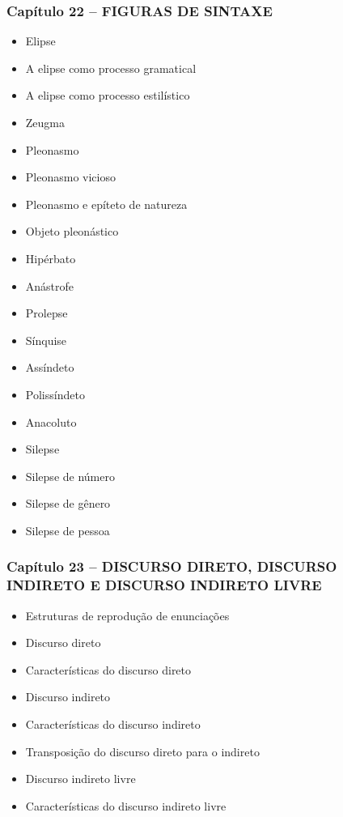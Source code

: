 \documentclass[a4paper,12pt]{article}[abntex2]
\begin{document}
\subsubsection*{Capítulo 22 – FIGURAS DE SINTAXE}
\begin{itemize}
    \item Elipse
    \item A elipse como processo gramatical
    \item A elipse como processo estilístico
    \item Zeugma
    \item Pleonasmo
    \item Pleonasmo vicioso
    \item Pleonasmo e epíteto de natureza
    \item Objeto pleonástico
    \item Hipérbato
    \item Anástrofe
    \item Prolepse
    \item Sínquise
    \item Assíndeto
    \item Polissíndeto
    \item Anacoluto
    \item Silepse
    \item Silepse de número
    \item Silepse de gênero
    \item Silepse de pessoa
\end{itemize}

\subsubsection*{Capítulo 23 – DISCURSO DIRETO, DISCURSO INDIRETO E DISCURSO INDIRETO LIVRE}
\begin{itemize}
    \item Estruturas de reprodução de enunciações
    \item Discurso direto
    \item Características do discurso direto
    \item Discurso indireto
    \item Características do discurso indireto
    \item Transposição do discurso direto para o indireto
    \item Discurso indireto livre
    \item Características do discurso indireto livre
\end{itemize}
\end{document}
